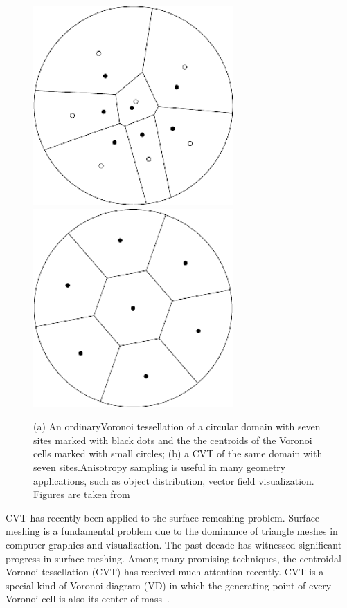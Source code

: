 \begin{figure}
\includegraphics[width=3in]{figs/intro/voronoi_2D.png}
\includegraphics[width=3in]{figs/intro/CVT_2D.png}
\caption{(a) An ordinaryVoronoi tessellation of a circular domain with seven sites marked with black dots and the the centroids of the Voronoi cells marked with small circles; (b) a CVT of the same domain with seven sites.Anisotropy sampling is useful in many geometry applications, such as object distribution, vector field visualization. Figures are taken from ~\cite{Liu:2009:CVT}  }
\label{fig:voronoi_and_CVT_2D}
\end{figure}

CVT has recently been applied to the surface remeshing problem. Surface meshing is a fundamental problem due to the dominance of triangle meshes in computer graphics and visualization. The past decade has witnessed significant progress in surface meshing. Among many promising techniques, the centroidal Voronoi tessellation (CVT) has received much attention recently. CVT is a special kind of Voronoi diagram (VD) in which the generating point of every Voronoi cell is also its center of mass~\cite{Du:1999:CVT}.

